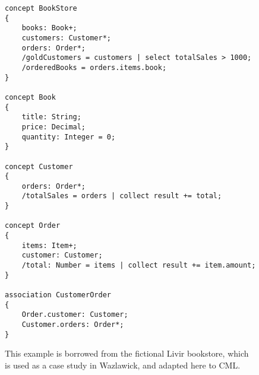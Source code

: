 \begin{figure}
\begin{verbatim}
concept BookStore
{
    books: Book+;
    customers: Customer*;
    orders: Order*;
    /goldCustomers = customers | select totalSales > 1000;
    /orderedBooks = orders.items.book;
}

concept Book
{
    title: String;
    price: Decimal;
    quantity: Integer = 0;
}

concept Customer
{
    orders: Order*;
    /totalSales = orders | collect result += total;
}

concept Order
{
    items: Item+;
    customer: Customer;
    /total: Number = items | collect result += item.amount;
}

association CustomerOrder
{
    Order.customer: Customer;
    Customer.orders: Order*;
}
\end{verbatim}
\caption{This example is borrowed from the fictional Livir bookstore, which is used as a case study in Wazlawick, and adapted here to CML.}
\end{figure}
